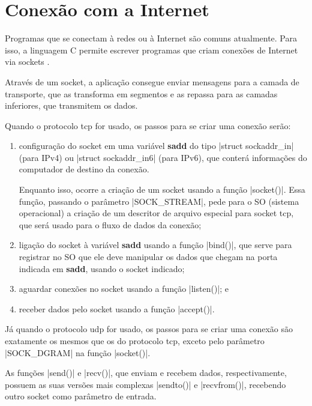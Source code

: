 
\section{Conexão com a Internet}

Programas que se conectam à redes ou à Internet são comuns atualmente. Para isso, a
linguagem C permite escrever programas que criam conexões de Internet via \glspl{socket}
\cite{site:beej}.

Através de um \gls*{socket}, a aplicação consegue enviar mensagens para a camada de
transporte, que as transforma em segmentos e as repassa para as camadas inferiores, que
transmitem os dados.

\newpage
Quando o protocolo \gls{tcp} for usado, os passos para se criar uma conexão serão:

\begin{enumerate}
    \item configuração do \gls*{socket} em uma variável \textbf{sadd} do tipo
        \sverb|struct sockaddr_in| (para IPv4) ou \sverb|struct sockaddr_in6| (para
        IPv6), que conterá informações do computador de destino da conexão.

        Enquanto isso, ocorre a criação de um \gls*{socket} usando a função
        \sverb|socket()|. Essa função, passando o parâmetro \bverb|SOCK_STREAM|, pede
        para o SO (sistema operacional) a criação de um descritor de arquivo especial
        para \gls*{socket} \gls*{tcp}, que será usado para o fluxo de dados da conexão;

    \item ligação do \gls*{socket} à variável \textbf{sadd} usando a função
        \sverb|bind()|, que serve para registrar no SO que ele deve manipular os dados
        que chegam na porta indicada em \textbf{sadd}, usando o \gls*{socket} indicado;

    \item aguardar conexões no \gls*{socket} usando a função \sverb|listen()|; e

    \item receber dados pelo \gls*{socket} usando a função \sverb|accept()|.
\end{enumerate}



\newpage
Já quando o protocolo \gls{udp} for usado, os passos para se criar uma conexão são
exatamente os mesmos que os do protocolo \gls*{tcp}, exceto pelo parâmetro
\bverb|SOCK_DGRAM| na função \sverb|socket()|.


As funções \sverb|send()| e \sverb|recv()|, que enviam e recebem dados, respectivamente,
possuem as suas versões mais complexas \sverb|sendto()| e \sverb|recvfrom()|, recebendo
outro \gls*{socket} como parâmetro de entrada.